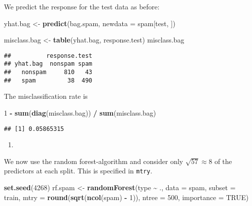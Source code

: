 \documentclass[
]{article}
\newenvironment{Shaded}{\begin{snugshade}}{\end{snugshade}}
\newcommand{\AttributeTok}[1]{\textcolor[rgb]{0.13,0.29,0.53}{#1}}
\newcommand{\ConstantTok}[1]{\textcolor[rgb]{0.56,0.35,0.01}{#1}}
\newcommand{\DecValTok}[1]{\textcolor[rgb]{0.00,0.00,0.81}{#1}}
\newcommand{\FunctionTok}[1]{\textcolor[rgb]{0.13,0.29,0.53}{\textbf{#1}}}
\newcommand{\NormalTok}[1]{#1}
\newcommand{\OtherTok}[1]{\textcolor[rgb]{0.56,0.35,0.01}{#1}}
\newcommand{\SpecialCharTok}[1]{\textcolor[rgb]{0.81,0.36,0.00}{\textbf{#1}}}
\providecommand{\tightlist}{%
  \setlength{\itemsep}{0pt}\setlength{\parskip}{0pt}}
\begin{document}
We predict the response for the test data as before:

\begin{Shaded}
\begin{Highlighting}[]
\NormalTok{yhat.bag }\OtherTok{\textless{}{-}} \FunctionTok{predict}\NormalTok{(bag.spam, }\AttributeTok{newdata =}\NormalTok{ spam[test, ])}

\NormalTok{misclass.bag }\OtherTok{\textless{}{-}} \FunctionTok{table}\NormalTok{(yhat.bag, response.test)}
\NormalTok{misclass.bag}
\end{Highlighting}
\end{Shaded}

\begin{verbatim}
##          response.test
## yhat.bag  nonspam spam
##   nonspam     810   43
##   spam         38  490
\end{verbatim}

The misclassification rate is

\begin{Shaded}
\begin{Highlighting}[]
\DecValTok{1} \SpecialCharTok{{-}} \FunctionTok{sum}\NormalTok{(}\FunctionTok{diag}\NormalTok{(misclass.bag)) }\SpecialCharTok{/} \FunctionTok{sum}\NormalTok{(misclass.bag)}
\end{Highlighting}
\end{Shaded}

\begin{verbatim}
## [1] 0.05865315
\end{verbatim}

\begin{enumerate}
\def\labelenumi{\alph{enumi})}
\setcounter{enumi}{6}
\tightlist
\item
\end{enumerate}

We now use the random forest-algorithm and consider only
\(\sqrt{57}\approx 8\) of the predictors at each split. This is
specified in \texttt{mtry}.

\begin{Shaded}
\begin{Highlighting}[]
\FunctionTok{set.seed}\NormalTok{(}\DecValTok{4268}\NormalTok{)}
\NormalTok{rf.spam }\OtherTok{\textless{}{-}} \FunctionTok{randomForest}\NormalTok{(type }\SpecialCharTok{\textasciitilde{}}\NormalTok{ .,}
                        \AttributeTok{data =}\NormalTok{ spam,}
                        \AttributeTok{subset =}\NormalTok{ train,}
                        \AttributeTok{mtry =} \FunctionTok{round}\NormalTok{(}\FunctionTok{sqrt}\NormalTok{(}\FunctionTok{ncol}\NormalTok{(spam) }\SpecialCharTok{{-}} \DecValTok{1}\NormalTok{)),}
                        \AttributeTok{ntree =} \DecValTok{500}\NormalTok{,}
                        \AttributeTok{importance =} \ConstantTok{TRUE}\NormalTok{)}
\end{Highlighting}
\end{Shaded}
\end{document}
